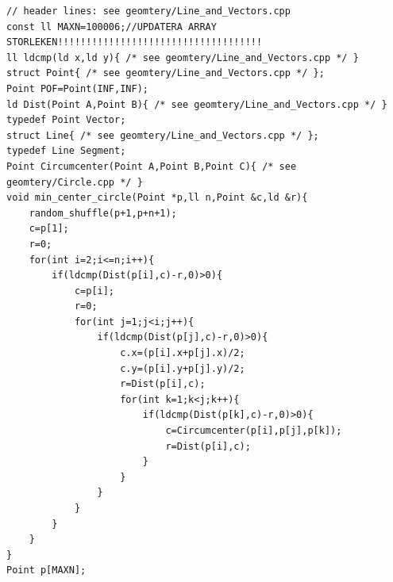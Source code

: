 
\begin{lstlisting}[breaklines=true]
// header lines: see geomtery/Line_and_Vectors.cpp
const ll MAXN=100006;//UPDATERA ARRAY STORLEKEN!!!!!!!!!!!!!!!!!!!!!!!!!!!!!!!!!!!!
ll ldcmp(ld x,ld y){ /* see geomtery/Line_and_Vectors.cpp */ }
struct Point{ /* see geomtery/Line_and_Vectors.cpp */ };
Point POF=Point(INF,INF);
ld Dist(Point A,Point B){ /* see geomtery/Line_and_Vectors.cpp */ }
typedef Point Vector;
struct Line{ /* see geomtery/Line_and_Vectors.cpp */ };
typedef Line Segment;
Point Circumcenter(Point A,Point B,Point C){ /* see geomtery/Circle.cpp */ }
void min_center_circle(Point *p,ll n,Point &c,ld &r){
    random_shuffle(p+1,p+n+1);
    c=p[1];
    r=0;
    for(int i=2;i<=n;i++){
        if(ldcmp(Dist(p[i],c)-r,0)>0){
            c=p[i];
            r=0;
            for(int j=1;j<i;j++){
                if(ldcmp(Dist(p[j],c)-r,0)>0){
                    c.x=(p[i].x+p[j].x)/2;
                    c.y=(p[i].y+p[j].y)/2;
                    r=Dist(p[i],c);
                    for(int k=1;k<j;k++){
                        if(ldcmp(Dist(p[k],c)-r,0)>0){
                            c=Circumcenter(p[i],p[j],p[k]);
                            r=Dist(p[i],c);
                        }
                    }
                }
            }
        }
    }
}
Point p[MAXN];
\end{lstlisting}

